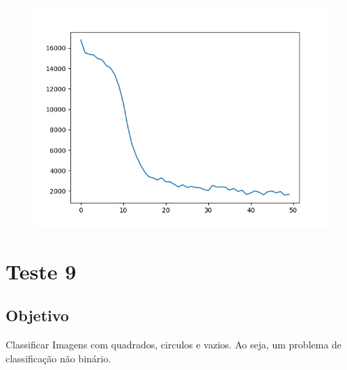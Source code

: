        
        \begin{figure}[H]
        \centering
        \includegraphics[width=1.0\linewidth]{imgs/Test_8/mae.png}
  
        \label{fig:enter-label}
    \end{figure}
    
    

\section{Teste 9}
\subsection{Objetivo}
    Classificar Imagens com quadrados, circulos e vazios. Ao seja, um problema de classificação não binário.
